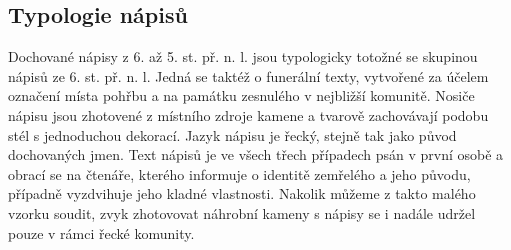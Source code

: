 
\subsection[typologie-nápisů-1]{Typologie nápisů}

Dochované nápisy z 6. až 5. st. př. n. l. jsou typologicky totožné se skupinou nápisů ze 6. st. př. n. l. Jedná se taktéž o funerální texty, vytvořené za účelem označení místa pohřbu a na památku zesnulého v nejbližší komunitě. Nosiče nápisu jsou zhotovené z místního zdroje kamene a tvarově zachovávají podobu stél s jednoduchou dekorací. Jazyk nápisu je řecký, stejně tak jako původ dochovaných jmen. Text nápisů je ve všech třech případech psán v první osobě a obrací se na čtenáře, kterého informuje o identitě zemřelého a jeho původu, případně vyzdvihuje jeho kladné vlastnosti. Nakolik můžeme z takto malého vzorku soudit, zvyk zhotovovat náhrobní kameny s nápisy se i nadále udržel pouze v rámci řecké komunity.

